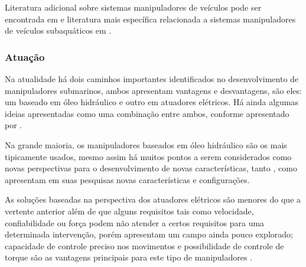 Literatura adicional sobre sistemas manipuladores de veículos pode ser encontrada em  e literatura mais específica relacionada a sistemas manipuladores de veículos subaquáticos em .


\subsubsection{Atuação}
\label{sec:atua}
Na atualidade há dois caminhos importantes identificados no desenvolvimento de manipuladores submarinos, ambos apresentam vantagens e desvantagens, são eles: um baseado em óleo hidráulico e outro em atuadores elétricos. Há ainda algumas ideias apresentadas como uma combinação entre ambos, conforme apresentado por .

Na grande maioria, os manipuladores baseados em óleo hidráulico são os mais tipicamente usados, mesmo assim há muitos pontos a serem considerados como novas perspectivas para o desenvolvimento de novas características, tanto ,  como  apresentam em suas pesquisas novas características e configurações.

As soluções baseadas na perspectiva dos atuadores elétricos são menores do que a vertente anterior além de que alguns requisitos tais como velocidade, confiabilidade ou força podem não atender a certos requisitos para uma determinada intervenção, porém apresentam um campo ainda pouco explorado; capacidade de controle preciso nos movimentos e possibilidade de controle de torque são as vantagens principais para este tipo de manipuladores \cite{ribas2015auv} \cite{fernandez2013grasping}.


%
%
%
%
%

